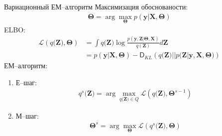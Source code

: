 \documentclass[9pt,pdf,hyperref={unicode}]{beamer}
\begin{document}
\begin{frame}{Вариационный ЕМ--алгоритм}
\justifying
	Максимизация обоснованости:
	\begin{equation}
	\label{sl:1:eq:1}
		\begin{aligned}
			\bm{\Theta} = \arg\max_{\bm{\Theta}} p\left(\textbf{y}|\textbf{X}, \bm{\Theta}\right)
		\end{aligned}
	\end{equation}
	ELBO:
	\begin{equation}
	\label{sl:1:eq:2}
		\begin{aligned}
			\mathcal{L}\left(q\bigr(\textbf{Z}\bigr), \bm{\Theta}\right)&= \int q\bigr(\textbf{Z}\bigr)\log\frac{p\left(\textbf{y}, \textbf{Z}|\bm{\Theta}, \textbf{X}\right)}{q\left(\textbf{Z}\right)}d\textbf{Z}\\
			&=p\left(\textbf{y}|\textbf{X}, \bm{\Theta}\right) - \mathsf{D}_{KL}\left(q\bigr(\textbf{Z}\bigr)||p\bigr(\textbf{Z}|\textbf{y}, \textbf{X}, \bm{\Theta}\bigr)\right)
		\end{aligned}
	\end{equation}
	ЕМ--алгоритм:
	\begin{enumerate}
		\item Е--шаг: 
			\begin{equation}
			\label{sl:1:eq:3}
				\begin{aligned}
					q^{s}\bigr(\textbf{Z}\bigr) = \arg\max_{q\bigr(\textbf{Z}\bigr)\in Q} \mathcal{L}\left(q\bigr(\textbf{Z}\bigr), \bm{\Theta}^{s-1}\right)		
				\end{aligned}
			\end{equation}
		\item М--шаг: 
			\begin{equation}
			\label{sl:1:eq:4}
				\begin{aligned}
					\bm{\Theta}^{s} = \arg\max_{\bm{\Theta}} \mathcal{L}\left(q^{s}\bigr(\textbf{Z}\bigr), \bm{\Theta}\right)		
				\end{aligned}
			\end{equation}
	\end{enumerate}
	

\end{frame}
\end{document}
